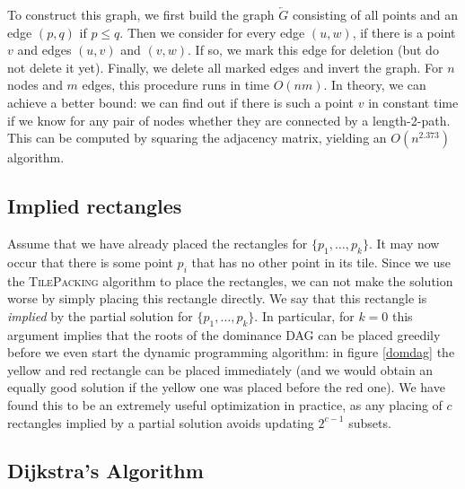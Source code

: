 \documentclass[11pt, a4paper, twocolumn]{article}
\begin{document}
To construct this graph, we first build the graph $\overleftarrow{G}$ consisting of all points and an edge $(p, q)$
if $p \leq q$. Then we consider for every edge $(u, w)$, if there is a point $v$ and edges $(u, v)$ and $(v, w)$.
If so, we mark this edge for deletion (but do not delete it yet). Finally, we delete all marked edges
and invert the graph. For $n$ nodes and $m$ edges, this procedure runs in time $O(nm)$.
In theory, we can achieve a better bound:
we can find out if there is such a point $v$ in constant time if we know for any pair of
nodes whether they are connected by a length-2-path.
This can be computed by squaring the adjacency matrix, yielding an $O(n^{2.373})$ algorithm.


\subsection{Implied rectangles}

Assume that we have already placed the rectangles for $\{p_1, \dots, p_k\}$. It may now occur that
there is some point $p_i$ that has no other point in its tile. Since we use the \textsc{TilePacking}
algorithm to place the rectangles, we can not make the solution worse by simply placing this rectangle
directly. We say that this rectangle is \textit{implied} by the partial solution for $\{p_1, \dots, p_k\}$.
In particular, for $k = 0$ this argument implies that the roots of the dominance DAG can be
placed greedily before we even start the dynamic programming algorithm: in figure \ref{domdag} the yellow
and red rectangle can be placed immediately (and we would obtain an equally good solution if the yellow one
was placed before the red one).
We have found this to be an extremely useful optimization in practice, as any placing of $c$ rectangles
implied by a partial solution avoids updating $2^{c-1}$ subsets.

\subsection{Dijkstra's Algorithm}
\end{document}
